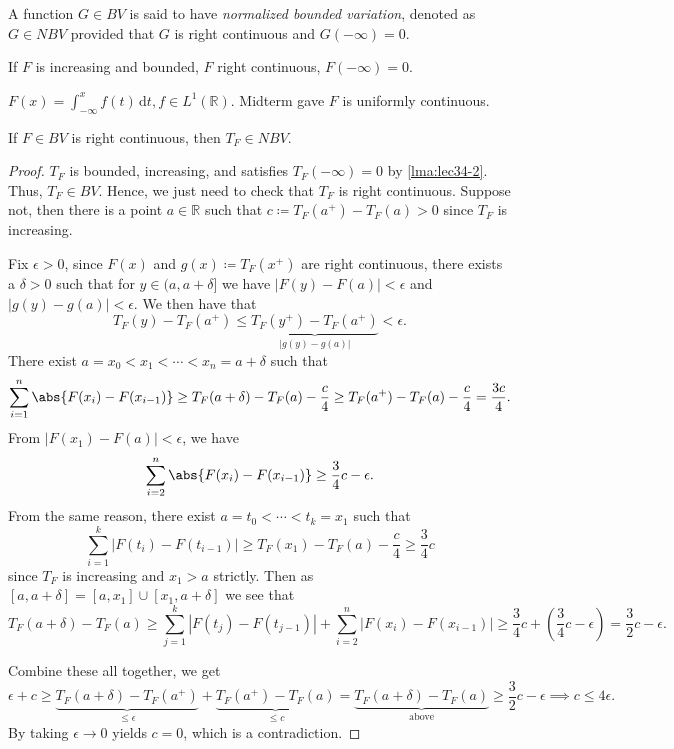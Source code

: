 \begin{definition}\label{def:normalized-bounded-variation}
	A function \(G \in BV\) is said to have \emph{normalized bounded variation}, denoted as \(G \in NBV\) provided that \(G\) is right continuous and \(G(-\infty) = 0\).
\end{definition}

\begin{eg}
	If \(F\) is increasing and bounded, \(F\) right continuous, \(F(-\infty) = 0\).

	\(F(x) = \int_{-\infty}^x f(t) \,\mathrm{d}t, f \in L^1(\mathbb{R})\). Midterm gave \(F\) is uniformly continuous.
\end{eg}

\begin{lemma}
	If \(F \in BV\) is right continuous, then \(T_F \in NBV\).
\end{lemma}
\begin{proof}
	\(T_F\) is bounded, increasing, and satisfies \(T_F(-\infty) = 0\) by \autoref{lma:lec34-2}. Thus, \(T_F \in BV\).
	Hence, we just need to check that \(T_F\) is right continuous. Suppose not, then there is a point \(a \in \mathbb{R}\) such that \(c \coloneqq T_F(a^+) - T_F(a) > 0\)
	since \(T_{F} \) is increasing.

	Fix \(\epsilon > 0\), since \(F(x)\) and \(g(x) \coloneqq T_F(x^+)\) are right continuous, there exists a \(\delta > 0\) such that for \(y \in (a,a+\delta]\) we have
	\(\left\vert F(y) - F(a) \right\vert < \epsilon\) and \(\left\vert g(y) - g(a) \right\vert < \epsilon\). We then have that
	\[
		T_F(y) - T_F(a^+) \leq \underbrace{T_F(y^+) - T_F(a^+)}_{\left\vert g(y) - g(a) \right\vert } < \epsilon.
	\]
	There exist \(a = x_0 < x_1 < \cdots < x_n = a + \delta\) such that
	\[
		\sum_{i=1}^n \abs{F(x_i) - F(x_{i-1})}  \geq T_F(a + \delta) - T_F(a) - \frac{c}{4} \geq T_F(a^+) - T_F(a) - \frac{c}{4} = \frac{3c}{4}.
	\]
	From \(\left\vert F(x_1) - F(a) \right\vert < \epsilon \), we have
	\[
		\sum_{i=2}^n \abs{F(x_i) - F(x_{i-1})} \geq \frac{3}{4}c - \epsilon.
	\]
	From the same reason, there exist \(a = t_0 < \cdots < t_k = x_1\) such that
	\[
		\sum_{i=1}^k \left\vert F(t_i) - F(t_{i-1}) \right\vert \geq T_F(x_1) - T_F(a) - \frac{c}{4} \geq \frac{3}{4}c
	\]
	since \(T_{F} \) is increasing and \(x_1 > a\) strictly. Then as \([a,a+\delta] = [a,x_1] \cup [x_1,a+\delta]\) we see that
	\[
		T_F(a + \delta) - T_F(a) \geq \sum_{j=1}^k \left\vert F(t_j) - F(t_{j-1}) \right\vert + \sum_{i=2}^n \left\vert F(x_i) - F(x_{i-1}) \right\vert \geq \frac{3}{4}c + \left(\frac{3}{4}c - \epsilon\right)= \frac{3}{2}c - \epsilon.
	\]

	Combine these all together, we get
	\[
		\epsilon + c  \geq \underbrace{T_F(a + \delta) - T_F(a^+)}_{\leq \epsilon} + \underbrace{T_F(a^+) - T_F(a)}_{\leq c} = \underbrace{T_F(a + \delta) - T_F(a)}_{\text{above}} \geq \frac{3}{2}c - \epsilon
		\implies c \leq 4 \epsilon.
	\]
	By taking \(\epsilon \to 0\) yields \(c = 0\), which is a contradiction.
\end{proof}

